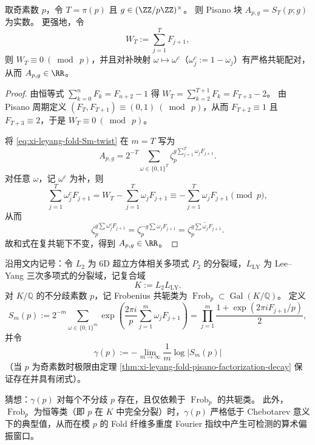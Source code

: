 \begin{proposition}\label{prop:xi-leyang-fold-pisano-block-real}
取奇素数 \(p\)，令 \(T=\pi(p)\) 且 \(g\in(\ZZ/p\ZZ)^\times\)。
则 Pisano 块 \(A_{p,g}=S_T(p;g)\) 为实数。
更强地，令
\[
W_T:=\sum_{j=1}^{T}F_{j+1},
\]
则 \(W_T\equiv 0\ (\bmod\ p)\)，并且对补映射 \(\omega\mapsto \omega^c\)（\(\omega_j^c:=1-\omega_j\)）有严格共轭配对，从而 \(A_{p,g}\in\RR\)。
\end{proposition}
\begin{proof}
由恒等式 \(\sum_{k=0}^{n}F_k=F_{n+2}-1\) 得
\(
W_T=\sum_{k=2}^{T+1}F_k=F_{T+3}-2
\)。
由 Pisano 周期定义 \((F_T,F_{T+1})\equiv(0,1)\ (\bmod\ p)\)，从而 \(F_{T+2}\equiv 1\) 且 \(F_{T+3}\equiv 2\)，于是 \(W_T\equiv 0\ (\bmod\ p)\)。
\par
将 \eqref{eq:xi-leyang-fold-Sm-twist} 在 \(m=T\) 写为
\[
A_{p,g}
=2^{-T}\sum_{\omega\in\{0,1\}^T}\zeta_p^{g\sum_{j=1}^{T}\omega_jF_{j+1}}.
\]
对任意 \(\omega\)，记 \(\omega^c\) 为补，则
\[
\sum_{j=1}^{T}\omega^c_jF_{j+1}=W_T-\sum_{j=1}^{T}\omega_jF_{j+1}\equiv -\sum_{j=1}^{T}\omega_jF_{j+1}\pmod p,
\]
从而
\[
\zeta_p^{g\sum \omega^c_jF_{j+1}}
=\zeta_p^{-g\sum \omega_jF_{j+1}}
=\overline{\zeta_p^{g\sum \omega_jF_{j+1}}}.
\]
故和式在复共轭下不变，得到 \(A_{p,g}\in\RR\)。
\end{proof}

\begin{conjecture}\label{conj:xi-6d-leyang-fold-chebotarev-resonance}
沿用文内记号：令 \(L_2\) 为 6D 超立方体相关多项式 \(P_2\) 的分裂域，\(L_{\mathrm{LY}}\) 为 Lee--Yang 三次多项式的分裂域，记复合域
\[
K:=L_2L_{\mathrm{LY}}.
\]
对 \(K/\mathbb Q\) 的不分歧素数 \(p\)，记 Frobenius 共轭类为
\(
\operatorname{Frob}_p\subset\operatorname{Gal}(K/\mathbb Q)
\)。
定义
\[
S_m(p):=
2^{-m}\sum_{\omega\in\{0,1\}^m}
\exp\!\left(
\frac{2\pi i}{p}\sum_{j=1}^{m}\omega_jF_{j+1}
\right)
=
\prod_{j=1}^{m}\frac{1+\exp(2\pi iF_{j+1}/p)}{2},
\]
并令
\[
\gamma(p):=
-\lim_{m\to\infty}\frac{1}{m}\log|S_m(p)|
\]
（当 \(p\) 为奇素数时极限由定理 \ref{thm:xi-leyang-fold-pisano-factorization-decay} 保证存在并具有闭式）。

猜想：\(\gamma(p)\) 对每个不分歧 \(p\) 存在，且仅依赖于 \(\operatorname{Frob}_p\) 的共轭类。
此外，\(\operatorname{Frob}_p\) 为恒等类（即 \(p\) 在 \(K\) 中完全分裂）时，\(\gamma(p)\) 严格低于 Chebotarev 意义下的典型值，从而在模 \(p\) 的 Fold 纤维多重度 Fourier 指纹中产生可检测的算术偏振窗口。
\end{conjecture}

\endinput

